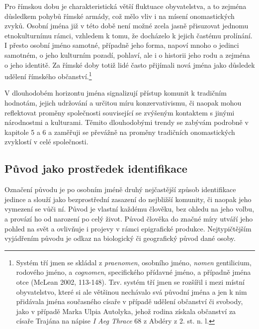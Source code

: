 Pro římskou dobu je charakteristická větší fluktuace obyvatelstva, a to zejména důsledkem pohybů římské armády, což mělo vliv i na mísení onomastických zvyků. Osobní jména již v této době není možné zcela jasně přisuzovat jednomu etnokulturnímu rámci, vzhledem k tomu, že docházelo k jejich častému prolínání. I přesto osobní jméno samotné, případně jeho forma, napoví mnoho o jedinci samotném, o jeho kulturním pozadí, pohlaví, ale i o historii jeho rodu a zejména o jeho identitě. Za římské doby totiž lidé často přijímali nová jména jako důsledek udělení římského občanství.\footnote{Systém tří jmen se skládal z {\em praenomen}, osobního jméno, {\em nomen} gentilicium, rodového jméno, a {\em cognomen}, specifického přídavné jméno, a případně jména otce (McLean 2002, 113-148). Tzv. systém tří jmen se rozšířil i mezi místní obyvatelstvo, které si ale většinou nechávalo svá původní jména a jen k nim přidávala jména současného císaře v případě udělení občanství či svobody, jako v případě Marka Ulpia Autolyka, jehož rodina získala občanství za císaře Trajána na nápise {\em I Aeg Thrace} 68 z Abdéry z 2. st. n. l.}

V dlouhodobém horizontu jména signalizují přístup komunit k tradičním hodnotám, jejich udržování a určitou míru konzervativismu, či naopak mohou reflektovat proměny společnosti související se zvýšeným kontaktem s jinými národnostmi a kulturami. Těmito dlouhodobými trendy se zabývám podrobně v kapitole 5 a 6 a zaměřuji se převážně na proměny tradičních onomastických zvyklostí v celé společnosti.

\subsection[původ-jako-prostředek-identifikace]{Původ jako prostředek identifikace}

Označení původu je po osobním jméně druhý nejčastější způsob identifikace jedince a slouží jako bezprostřední zasazení do nejbližší komunity, či naopak jeho vymezení se vůči ní. Původ je vlastní každému člověku, bez ohledu na jeho volbu, a provází ho od narození po celý život. Původ člověka do značné míry utváří jeho pohled na svět a ovlivňuje i projevy v rámci epigrafické produkce. Nejtypičtějším vyjádřením původu je odkaz na biologický či geografický původ dané osoby.

